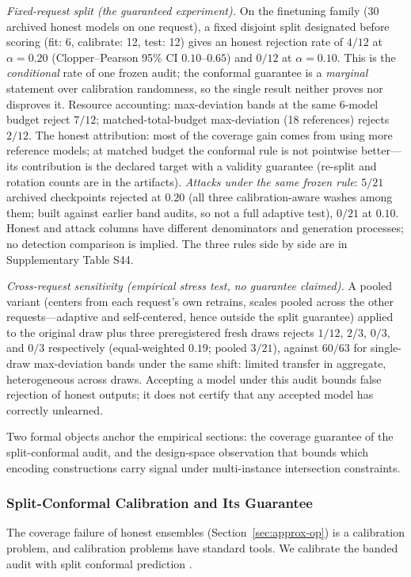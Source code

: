 \documentclass[lettersize,journal]{IEEEtran}
\begin{document}
\emph{Fixed-request split (the guaranteed experiment).} On the
finetuning family (30 archived honest models on one request),
a fixed disjoint split designated before scoring (fit: 6,
calibrate: 12, test: 12) gives an honest rejection rate of
$4/12$ at $\alpha = 0.20$ (Clopper--Pearson 95\% CI
$0.10$--$0.65$) and $0/12$ at $\alpha = 0.10$. This is the
\emph{conditional} rate of one frozen audit; the conformal
guarantee is a \emph{marginal} statement over calibration
randomness, so the single result neither proves nor disproves
it. Resource accounting: max-deviation bands at the same
$6$-model budget reject $7/12$; matched-total-budget
max-deviation (18 references) rejects $2/12$. The honest
attribution: most of the coverage gain comes from using more
reference models; at matched budget the conformal rule is not
pointwise better---its contribution is the declared target
with a validity guarantee (re-split and rotation counts are in
the artifacts). \emph{Attacks under the same frozen rule}:
$5/21$ archived checkpoints rejected at $0.20$ (all three
calibration-aware washes among them; built against earlier
band audits, so not a full adaptive test), $0/21$ at
$0.10$. Honest and attack columns have different denominators
and generation processes; no detection comparison is implied.
The three rules side by side are in Supplementary Table S44.



\emph{Cross-request sensitivity (empirical stress test, no
guarantee claimed).} A pooled variant (centers from each
request's own retrains, scales pooled across the other
requests---adaptive and self-centered, hence outside the split
guarantee) applied to the original draw plus three
preregistered fresh draws rejects $1/12$, $2/3$, $0/3$, and
$0/3$ respectively (equal-weighted $0.19$; pooled $3/21$),
against $60/63$ for single-draw max-deviation bands under the
same shift: limited transfer in aggregate, heterogeneous
across draws. Accepting a model under this audit bounds false
rejection of honest outputs; it does not certify that any
accepted model has correctly unlearned.



Two formal objects anchor the empirical sections: the coverage
guarantee of the split-conformal audit, and the design-space
observation that bounds which encoding constructions carry signal
under multi-instance intersection constraints.

\subsubsection{Split-Conformal Calibration and Its Guarantee}
\label{sec:m3}
The coverage failure of honest ensembles
(Section~\ref{sec:approx-op}) is a calibration problem,
and calibration problems have standard tools. We calibrate the
banded audit with split conformal prediction
\cite{vovk2005algorithmic, angelopoulos2021gentle}.
\end{document}

